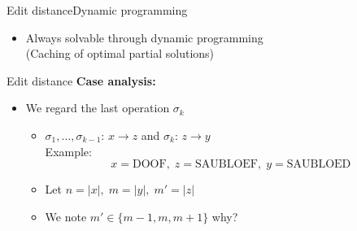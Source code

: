 \begin{frame}{Edit distance}{Dynamic programming}
\begin{itemize}
\begin{itemize}
          \begin{figure}[!h]
          \end{figure}
      \end{itemize}
    \item<10->
      Always solvable through dynamic programming\\
      (Caching of optimal partial solutions)
  \end{itemize}
\end{frame}


\begin{frame}{Edit distance}
  \textbf{Case analysis:}
  \begin{itemize}
    \item<2->
      We regard the last operation $\sigma_k$
      \begin{itemize}
        \item<3->
          $\sigma_1, \dots, \sigma_{k-1}$:
          {\color{Mittel-Blau}$x \rightarrow z$} and $\sigma_k$:
          {\color{Mittel-Blau}$z \rightarrow y$}\\
          Example:
          \begin{displaymath}
            x = \mathrm{DOOF}, \;
            z = \mathrm{SAUBLOEF}, \;
            y = \mathrm{SAUBLOED}
          \end{displaymath}
        \item<4->
          Let $n = \vert x \vert, \; m = \vert y \vert, \; m' = \vert z \vert$
        \item<5->
          We note $m' \in \{m - 1, m, m + 1\}$
          \hspace{1.5em}
          {\color{gray}why?}
      \end{itemize}
  \end{itemize}
\end{frame}

